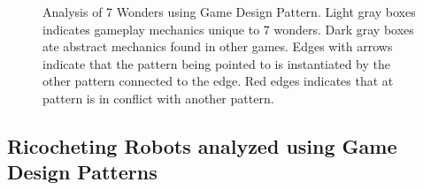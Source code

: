 \documentclass[a4paper]{article}
\begin{document}
\begin{figure}[htb]
\begin{tikzpicture}

  \end{tikzpicture}
\caption{Analysis of 7 Wonders using Game Design Pattern. Light gray boxes indicates gameplay mechanics unique to 7 wonders. Dark gray boxes ate abstract mechanics found in other games. Edges with arrows indicate that the pattern being pointed to is instantiated by the other pattern connected to the edge. Red edges indicates that at pattern is in conflict with another pattern.}
\label{fig:A7W}
\end{figure}

\newpage
\subsection{Ricocheting Robots analyzed using Game Design Patterns}
\end{document}
